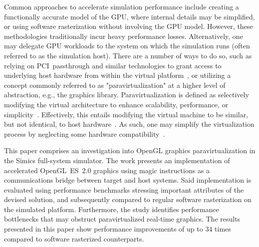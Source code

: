 Common approaches to accelerate simulation performance include creating a functionally accurate model of the GPU, where internal details may be simplified, or using software rasterization without involving the GPU model.
However, these methodologies traditionally incur heavy performance losses.
Alternatively, one may delegate GPU workloads to the system on which the simulation runs (often referred to as the simulation host).
There are a number of ways to do so, such as relying on PCI~passthrough and similar technologies to grant access to underlying host hardware from within the virtual platform~, or utilizing a concept commonly referred to as "paravirtualization" at a higher level of abstraction, e.g., the graphics library.
Paravirtualization is defined as selectively modifying the virtual architecture to enhance scalability, performance, or simplicity~.
Effectively, this entails modifying the virtual machine to be similar, but not identical, to host hardware~.
As such, one may simplify the virtualization process by neglecting some hardware compatibility~.

This paper comprises an investigation into OpenGL graphics paravirtualization in the Simics full-system simulator.
The work presents an implementation of accelerated OpenGL~ES~$2.0$ graphics using magic instructions as a communications bridge between target and host systems.
Said implementation is evaluated using performance benchmarks stressing important attributes of the devised solution, and subsequently compared to regular software rasterization on the simulated platform.
Furthermore, the study identifies performance bottlenecks that may obstruct paravirtualized real-time graphics.
The results presented in this paper show performance improvements of up to $34$ times compared to software rasterized counterparts.

